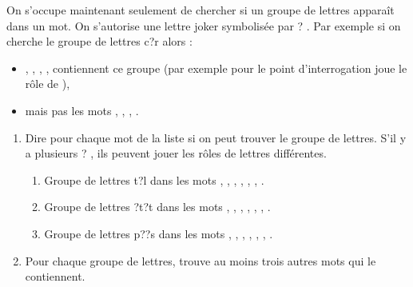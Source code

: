\documentclass[class=report,crop=false, 12pt]{standalone}
\begin{document}
\begin{activite}

On s'occupe maintenant seulement de chercher si un groupe de lettres apparaît dans un mot. On s'autorise une lettre joker symbolisée par \og ? \fg{}. Par exemple si on cherche le groupe de lettres \og c\!?r \fg{} alors :

\begin{itemize}
  \item {}, , , ,  contiennent ce groupe (par exemple pour  le point d'interrogation joue le rôle de ),
  \item  mais pas les mots , , , . 
\end{itemize}

\begin{enumerate}
  \item Dire pour chaque mot de la liste si on peut trouver le groupe de lettres. S'il y a plusieurs \og ? \fg{}, ils peuvent jouer les rôles de lettres différentes.
  \begin{enumerate}
    \item Groupe de lettres \og t\!?l \fg{} dans les mots , , , , , , .
    \item Groupe de lettres \og \!?t\!?t \fg{} dans les mots , , , , , , .
    \item Groupe de lettres \og p\!?\!?s \fg{} dans les mots , , , , , , .
  \end{enumerate}
  
     
  \item Pour chaque groupe de lettres, trouve au moins trois autres mots qui le contiennent.
\end{enumerate}

\end{activite}
\end{document}
